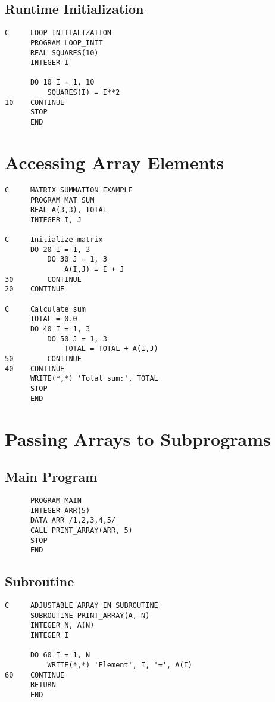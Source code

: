 \documentclass{book}
\begin{document}
\subsection*{Runtime Initialization}
\begin{verbatim}
C     LOOP INITIALIZATION
      PROGRAM LOOP_INIT
      REAL SQUARES(10)
      INTEGER I
      
      DO 10 I = 1, 10
          SQUARES(I) = I**2
10    CONTINUE
      STOP
      END
\end{verbatim}

\section*{Accessing Array Elements}
\begin{verbatim}
C     MATRIX SUMMATION EXAMPLE
      PROGRAM MAT_SUM
      REAL A(3,3), TOTAL
      INTEGER I, J
      
C     Initialize matrix
      DO 20 I = 1, 3
          DO 30 J = 1, 3
              A(I,J) = I + J
30        CONTINUE
20    CONTINUE

C     Calculate sum
      TOTAL = 0.0
      DO 40 I = 1, 3
          DO 50 J = 1, 3
              TOTAL = TOTAL + A(I,J)
50        CONTINUE
40    CONTINUE
      WRITE(*,*) 'Total sum:', TOTAL
      STOP
      END
\end{verbatim}

\section{Passing Arrays to Subprograms}
\subsection{Main Program}
\begin{verbatim}
      PROGRAM MAIN
      INTEGER ARR(5)
      DATA ARR /1,2,3,4,5/
      CALL PRINT_ARRAY(ARR, 5)
      STOP
      END
\end{verbatim}

\subsection{Subroutine}
\begin{verbatim}
C     ADJUSTABLE ARRAY IN SUBROUTINE
      SUBROUTINE PRINT_ARRAY(A, N)
      INTEGER N, A(N)
      INTEGER I
      
      DO 60 I = 1, N
          WRITE(*,*) 'Element', I, '=', A(I)
60    CONTINUE
      RETURN
      END
\end{verbatim}
\end{document}
